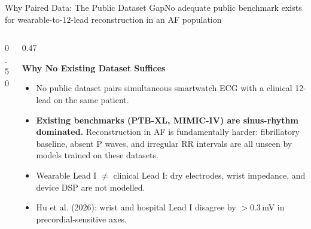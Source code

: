 \documentclass[aspectratio=169,10pt]{beamer}
\begin{document}
\begin{frame}{Why Paired Data: The Public Dataset Gap}{No adequate public benchmark exists for wearable-to-12-lead reconstruction in an AF population}
\begin{columns}[T]
  \begin{column}{0.50\textwidth}
    \begin{table}[h]
    \centering
    \end{table}
  \end{column}
  \begin{column}{0.47\textwidth}
    \begin{block}{\textbf{Why No Existing Dataset Suffices}}
      \scriptsize
      \begin{itemize}
        \setlength{\itemsep}{0.18em}
        \item No public dataset pairs simultaneous smartwatch ECG with a clinical 12-lead on the same patient.
        \item \textbf{Existing benchmarks (PTB-XL, MIMIC-IV) are sinus-rhythm dominated.} Reconstruction in AF is fundamentally harder: fibrillatory baseline, absent P waves, and irregular RR intervals are all unseen by models trained on these datasets.
        \item Wearable Lead I $\neq$ clinical Lead I: dry electrodes, wrist impedance, and device DSP are not modelled.
        \item Hu et al. (2026): wrist and hospital Lead I disagree by $>$0.3\,mV in precordial-sensitive axes.

\end{itemize}
\end{block}
\end{column}
\end{columns}
\end{frame}
\end{document}
